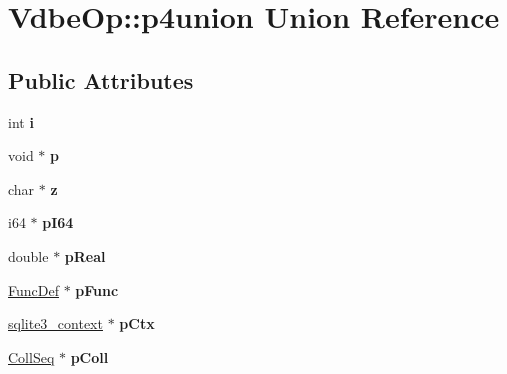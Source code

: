 \hypertarget{union_vdbe_op_1_1p4union}{}\section{Vdbe\+Op\+:\+:p4union Union Reference}
\label{union_vdbe_op_1_1p4union}
\subsection*{Public Attributes}
\begin{DoxyCompactItemize}
\item 
\mbox{\label{union_vdbe_op_1_1p4union_a67b1d33cd04d43500226f2fc5cd0c6c4}} 
int {\bfseries i}
\item 
\mbox{\label{union_vdbe_op_1_1p4union_a084b1849db2067d5aa349e3988d2f515}} 
void $\ast$ {\bfseries p}
\item 
\mbox{\label{union_vdbe_op_1_1p4union_ab679a57e8d973f81a8d51f925502d430}} 
char $\ast$ {\bfseries z}
\item 
\mbox{\label{union_vdbe_op_1_1p4union_a6058dda6de49e297bc89e53060e97354}} 
i64 $\ast$ {\bfseries p\+I64}
\item 
\mbox{\label{union_vdbe_op_1_1p4union_a39e6887128786424eaf8dc31e7a88f66}} 
double $\ast$ {\bfseries p\+Real}
\item 
\mbox{\label{union_vdbe_op_1_1p4union_a6832dea5d3721f13f718592de2bc9b23}} 
\mbox{\hyperlink{struct_func_def}{Func\+Def}} $\ast$ {\bfseries p\+Func}
\item 
\mbox{\label{union_vdbe_op_1_1p4union_aa1ca37d471aef629b85a8b3c628faa06}} 
\mbox{\hyperlink{structsqlite3__context}{sqlite3\+\_\+context}} $\ast$ {\bfseries p\+Ctx}
\item 
\mbox{\label{union_vdbe_op_1_1p4union_abdd570179d6f6428b96d56b0292f068b}} 
\mbox{\hyperlink{struct_coll_seq}{Coll\+Seq}} $\ast$ {\bfseries p\+Coll}
\item 
\mbox{\label{union_vdbe_op_1_1p4union_a52d756a2ccc11e5e87703e6f8129261c}} 

\end{DoxyCompactItemize}
